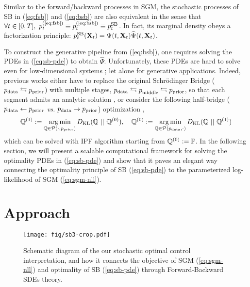 \documentclass{article}
\def\eqref#1{(\ref{#1})}
\def\rvX{{\mathbf{X}}}
\newcommand{\pdata}{p_{\rm{data}}}
\newcommand{\KL}{D_{\mathrm{KL}}}
\DeclareMathOperator*{\argmin}{arg\,min}
\def\calP{{\cal P}}
\begin{document}
Similar to the forward/backward processes in SGM,
the stochastic processes of SB in \eqref{eq:fsb} and \eqref{eq:bsb}
are also equivalent in the sense that
$\forall t\in[0,T],~\pp{t}{\eqref{eq:fsb}} \equiv \pp{t}{\eqref{eq:bsb}} \equiv \pp{t}{SB}$.
In fact, its marginal density obeys a factorization principle:
$\pp{t}{SB}(\rvX_t) = {\Psi}(t,\rvX_t)\widehat{\Psi}(t,\rvX_t)$.


To construct the generative pipeline from \eqref{eq:bsb},
one requires solving the PDEs in \eqref{eq:sb-pde}
to obtain $\widehat{\Psi}$.
Unfortunately, these PDEs are hard to solve even for low-dimensional systems \citep{renardy2006introduction};
let alone for generative applications.
Indeed, previous works either have to replace the original Schr{\"o}dinger Bridge ($\pdata\leftrightarrows\prior$)
with multiple stages, $\pdata\leftrightarrows\pp{\text{middle}}{}\leftrightarrows\prior$,
so that each segment admits an analytic solution \citep{wang2021deep},
or consider the following half-bridge ($\pdata\leftarrow\prior$ \textit{vs.} $\pdata\rightarrow\prior$) optimization \citep{de2021diffusion,vargas2021solving},
\begin{align*}
    \QQ^{(1)} := \argmin_{\QQ\in\calP(\cdot, \prior)} \KL(\QQ~||~\QQ^{(0)}), \quad
    \QQ^{(0)}   := \argmin_{\QQ\in\calP(\pdata, \cdot)} \KL(\QQ~||~\QQ^{(1)})
\end{align*}
which can be solved with IPF algorithm \citep{kullback1968probability}
starting from ${\mathbb{Q}}^{(0)} := {\mathbb{P}}$.
In the following section,
we will present a scalable computational framework for
solving the optimality PDEs in \eqref{eq:sb-pde}
and show that it paves an elegant way connecting the optimality principle of SB \eqref{eq:sb-pde} to
the parameterized log-likelihood of SGM \eqref{eq:sgm-nll}.


 
\vspace{-1pt}
\section{Approach} \label{sec:3}
\vspace{-1pt}


\begin{figure}
  \vskip -0.2in
  \centering
  \texttt{[image: fig/sb3-crop.pdf]}
  \caption{
    Schematic diagram of the our stochastic optimal control interpretation,
    and how it connects the objective of SGM \eqref{eq:sgm-nll}
    and optimality of SB \eqref{eq:sb-pde} through Forward-Backward SDEs theory.
  }
  \label{fig:2}
  \vskip -0.05in
\end{figure}
\end{document}
